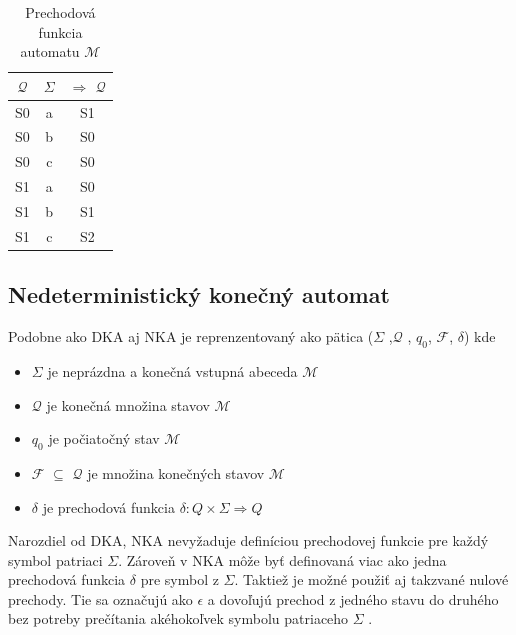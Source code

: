 \begin{table}[!htbp]
    \begin{center}
        \begin{tabular}{c c|c}
            $\mathcal{Q}$ & $\Sigma$ & $\Rightarrow$ $\mathcal{Q}$ \\ \hline
            S0            & a        & S1                          \\
            S0            & b        & S0                          \\
            S0            & c        & S0                          \\
            S1            & a        & S0                          \\
            S1            & b        & S1                          \\
            S1            & c        & S2                          \\
        \end{tabular}
        \caption{Prechodová funkcia automatu $\mathcal{M}$}
        \label{table:dfaPrechodovaFunckcia}
    \end{center}
\end{table}


\subsection{Nedeterministický konečný automat}
\noindent Podobne ako DKA aj NKA je reprenzentovaný ako  pätica ($\Sigma$ ,$\mathcal{Q}$ , $q_0$, $\mathcal{F}$, $\delta$) kde
\begin{itemize}
    \item $\Sigma$ je neprázdna a konečná vstupná abeceda $\mathcal{M}$
    \item $\mathcal{Q}$ je konečná množina stavov $\mathcal{M}$
    \item $q_0$ je počiatočný stav $\mathcal{M}$
    \item $\mathcal{F}$ $\subseteq$ $\mathcal{Q}$ je množina konečných stavov $\mathcal{M}$
    \item $\delta$ je prechodová funkcia  \begin{math}\delta : Q \times \Sigma \Rightarrow Q\end{math}
\end{itemize}

Narozdiel od DKA, NKA nevyžaduje definíciou prechodovej funkcie pre každý symbol
patriaci $\Sigma$. Zároveň v NKA môže byť definovaná viac ako jedna prechodová funkcia $\delta$ pre symbol z $\Sigma$.
Taktiež je možné použiť aj takzvané nulové prechody.
Tie sa označujú ako $\epsilon$ a dovoľujú prechod z jedného stavu do druhého bez potreby prečítania akéhokoľvek symbolu patriaceho $\Sigma$ \cite{FiniteStateMachines}.